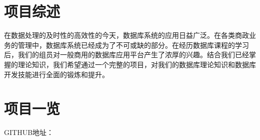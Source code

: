 \documentclass[../report.tex]{subfiles}
\begin{document}
\section{项目综述}

在数据处理的及时性的高效性的今天，数据库系统的应用日益广泛。在各类商政业务的管理中，数据库系统已经成为了不可或缺的部分。在经历数据库课程的学习后，我们的组员对一般商用的数据库应用平台产生了浓厚的兴趣。结合我们已经掌握的理论知识，我们希望通过一个完整的项目，对我们的数据库理论知识和数据库开发技能进行全面的锻炼和提升。

\section {项目一览}

GITHUB地址： 
\end{document}

